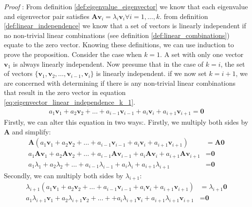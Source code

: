 \documentclass[a4paper,12pt]{article}
\newcommand{\matrx}[1]{\bm{#1}}
\newcommand{\vectr}[1]{\textbf{#1}}
\newcommand{\italic}[1]{\textit{#1}}
\begin{document}
	\italic{Proof} \cite{proof_eigen_vec_lid}: From definition \ref{def:eigenvalue_eigenvector} we know that each eigenvalue and eigenvector pair satisfies $ \matrx{A}\vectr{v}_i = \lambda_i \vectr{v}_i \forall i = 1,\ldots,k$. from definition \ref{def:linear_independence} we know that a set of vectors is linearly independent if no non-trivial linear combinations (see definition \ref{def:linear_combinations}) equate to the zero vector. Knowing these definitions, we can use induction to prove the proposition.
	Consider the case when $ k = 1 $. A set with only one vector $ \vectr{v}_1 $ is always linearly independent. Now presume that in the case of $ k = i $, the set of vectors $ \{\vectr{v}_1,\vectr{v}_2,\ldots,\vectr{v}_{i - 1},\vectr{v}_i\} $ is linearly independent. if we now set $ k = i + 1 $, we are concerned with determining if there is any non-trivial linear combinations that result in the zero vector in equation \ref{eq:eigenvector_linear_independence_k_1}. 
	\begin{align}
		a_1 \vectr{v}_1 + a_2 \vectr{v}_2 + \ldots + a_{i - 1} \vectr{v}_{i - 1} + a_i \vectr{v}_i + a_{i + 1} \vectr{v}_{i + 1} = \vectr{0}
		\label{eq:eigenvector_linear_independence_k_1}
	\end{align}
	Firstly, we can alter this equation in two ways:. Firstly, we multiply both sides by $ \matrx{A} $ and simplify:
	\begin{align}
		\matrx{A}(a_1 \vectr{v}_1 + a_2 \vectr{v}_2 + \ldots + a_{i - 1} \vectr{v}_{i - 1} + a_i \vectr{v}_i + a_{i + 1} \vectr{v}_{i + 1}) &= \matrx{A}\vectr{0} \nonumber \\
		a_1 \matrx{A}\vectr{v}_1 + a_2 \matrx{A}\vectr{v}_2 + \ldots + a_{i - 1} \matrx{A}\vectr{v}_{i - 1} + a_i \matrx{A}\vectr{v}_i + a_{i + 1} \matrx{A}\vectr{v}_{i + 1} &= \vectr{0} \nonumber \\
		\label{eq:eigenvector_linear_independence_eq_1} a_1 \lambda_1 + a_2 \lambda_2 + \ldots + a_{i - 1} \lambda_{i - 1} + a_i \lambda_i + a_{i + 1} \lambda_{i + 1} &= \vectr{0} 
	\end{align}
	Secondly, we can multiply both sides by $ \lambda_{i + 1} $:
	\begin{align}
		\lambda_{i + 1}(a_1 \vectr{v}_1 + a_2 \vectr{v}_2 + \ldots + a_{i - 1} \vectr{v}_{i - 1} + a_i \vectr{v}_i + a_{i + 1} \vectr{v}_{i + 1}) &= \lambda_{i + 1}\vectr{0} \nonumber \\
		\label{eq:eigenvector_linear_independence_eq_2} a_1\lambda_{i + 1} \vectr{v}_1 + a_2\lambda_{i + 1} \vectr{v}_2 + \ldots +  + a_i\lambda_{i + 1} \vectr{v}_i + a_{i + 1}\lambda_{i + 1} \vectr{v}_{i + 1} &= \vectr{0}
	\end{align}
\end{document}
